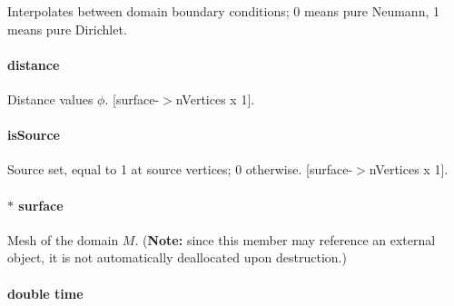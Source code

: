 Interpolates between domain boundary conditions; 0 means pure Neumann, 1 means pure Dirichlet. 

\hypertarget{structhm_tri_distance_a6a9fc819eb7899fe7efd9203a89ce059}{
\paragraph[{distance}]{ distance}}\label{structhm_tri_distance_a6a9fc819eb7899fe7efd9203a89ce059}


Distance values $\phi$. \mbox{[}surface-\/$>$n\-Vertices x 1\mbox{]}. 

\hypertarget{structhm_tri_distance_a5d82697941d1a917e535f65a6a7505c9}{
\paragraph[{is\-Source}]{ is\-Source}}\label{structhm_tri_distance_a5d82697941d1a917e535f65a6a7505c9}


Source set, equal to 1 at source vertices; 0 otherwise. \mbox{[}surface-\/$>$n\-Vertices x 1\mbox{]}. 

\hypertarget{structhm_tri_distance_a09f4d4f3d7f5ded5ba8de7d34a088a38}{
\paragraph[{surface}]{$\ast$ surface}}\label{structhm_tri_distance_a09f4d4f3d7f5ded5ba8de7d34a088a38}


Mesh of the domain $M$. ({\bfseries Note\-:} since this member may reference an external object, it is not automatically deallocated upon destruction.) 

\hypertarget{structhm_tri_distance_ab2d5aa7fce1a14d8bddfb2c333ea9679}{
\paragraph[{time}]{\setlength{\rightskip}{0pt plus 5cm}double time}}\label{structhm_tri_distance_ab2d5aa7fce1a14d8bddfb2c333ea9679}


